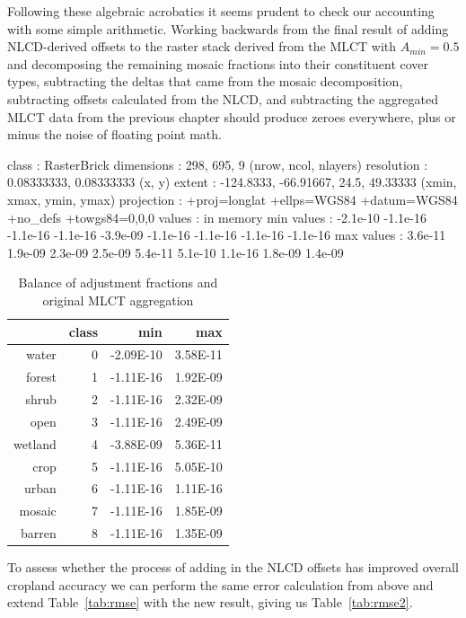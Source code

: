 Following these algebraic acrobatics it seems prudent to check our
accounting with some simple arithmetic.  Working backwards from the
final result of adding NLCD-derived offsets to the raster stack
derived from the MLCT with $A_{min}=0.5$ and decomposing the remaining
mosaic fractions into their constituent cover types, subtracting the
deltas that came from the mosaic decomposition, subtracting offsets
calculated from the NLCD, and subtracting the aggregated MLCT data
from the previous chapter 
should produce zeroes everywhere, plus or minus the noise of floating
point math.




\begin{Schunk}
\begin{Soutput}
class       : RasterBrick 
dimensions  : 298, 695, 9  (nrow, ncol, nlayers)
resolution  : 0.08333333, 0.08333333  (x, y)
extent      : -124.8333, -66.91667, 24.5, 49.33333  (xmin, xmax, ymin, ymax)
projection  : +proj=longlat +ellps=WGS84 +datum=WGS84 +no_defs +towgs84=0,0,0 
values      : in memory
min values  : -2.1e-10 -1.1e-16 -1.1e-16 -1.1e-16 -3.9e-09 -1.1e-16 -1.1e-16 -1.1e-16 -1.1e-16 
max values  : 3.6e-11 1.9e-09 2.3e-09 2.5e-09 5.4e-11 5.1e-10 1.1e-16 1.8e-09 1.4e-09 
\end{Soutput}
\end{Schunk}

\begin{table}[ht]
\begin{center}
\begin{tabular}{rrrr}
  \hline
 & class & min & max \\ 
  \hline
water & 0 & -2.09E-10 & 3.58E-11 \\ 
  forest & 1 & -1.11E-16 & 1.92E-09 \\ 
  shrub & 2 & -1.11E-16 & 2.32E-09 \\ 
  open & 3 & -1.11E-16 & 2.49E-09 \\ 
  wetland & 4 & -3.88E-09 & 5.36E-11 \\ 
  crop & 5 & -1.11E-16 & 5.05E-10 \\ 
  urban & 6 & -1.11E-16 & 1.11E-16 \\ 
  mosaic & 7 & -1.11E-16 & 1.85E-09 \\ 
  barren & 8 & -1.11E-16 & 1.35E-09 \\ 
   \hline
\end{tabular}
\caption{Balance of adjustment fractions and original MLCT aggregation}
\label{tab:restack_check}
\end{center}
\end{table}
To assess whether the process of adding in the NLCD offsets has
improved overall cropland accuracy we can perform the same error
calculation from above and extend Table~\ref{tab:rmse} with the new
result, giving us Table~\ref{tab:rmse2}.


